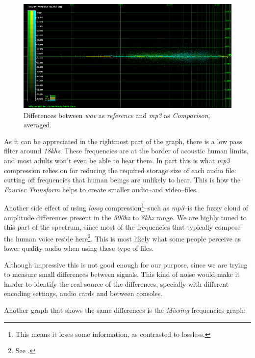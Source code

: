 \documentclass[10pt,a4paper]{report}
\newcommand{\ac}[1]{\textit{\acrshort{#1}}}
\newcommand{\hz}[1]{\textit{#1\acrshort{hz}}}
\newcommand{\khz}[1]{\textit{#1\acrshort{khz}}}
\begin{document}
\begin{figure}[H]
	\centering
	\includegraphics[width=1.0\linewidth]{images/interpretation/Plot6-mp3-2.png}
	\caption[WAV vs MP3 Averaged]{Differences between \ac{wav} as \textit{reference} and \ac{mp3} as \textit{Comparison}, averaged.}
	\label{fig:plot6-mp3-2}
\end{figure}

As it can be appreciated in the rightmost part of the graph, there is a low pass filter around \khz{18}. These frequencies are at the border of acoustic human limits, and most adults won't even be able to hear them. In part this is what \ac{mp3} compression relies on for reducing the required storage size of each audio file: cutting off frequencies that human beings are unlikely to hear. This is how the \textit{Fourier Transform} helps to create smaller audio--and video--files.

Another side effect of using \textit{lossy} compression\footnote{This means it loses some information, as contrasted to lossless.}--such as \ac{mp3}--is the fuzzy cloud of amplitude differences present in the \hz{500} to \khz{8} range. We are highly tuned to this part of the spectrum, since most of the frequencies that typically compose the human voice reside here\footnote{See \cite{humanvoice}.}. This is most likely what some people perceive as lower quality audio when using these type of files.

Although impressive this is not good enough for our purpose, since we are trying to measure small differences between signals. This kind of noise would make it harder to identify the real source of the differences, specially with different encoding settings, audio cards and between consoles.

Another graph that shows the same differences is the \textit{Missing} frequencies graph:
\end{document}
